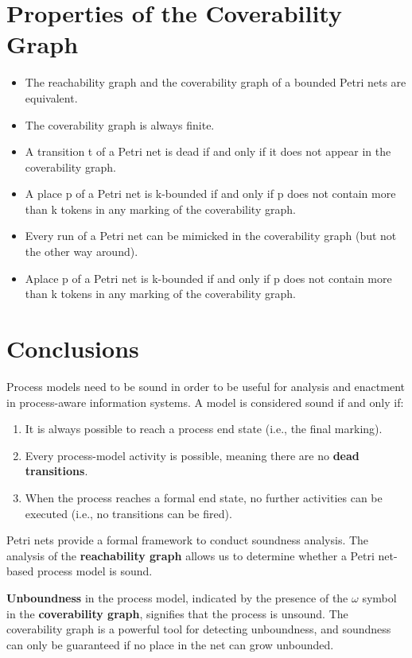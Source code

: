     
    
    \section{Properties of the Coverability Graph}
    \begin{itemize}
        \item The reachability graph and the coverability graph of a bounded Petri nets are equivalent.
        \item The coverability graph is always finite.
        \item A transition t of a Petri net is dead if and only if it does not appear in the coverability graph.
        \item A place p of a Petri net is k-bounded if and only if p does not contain more than k tokens in any marking of the coverability graph.
        \item Every run of a Petri net can be mimicked in the coverability graph (but not the other way around).
        \item Aplace p of a Petri net is k-bounded if and only if p does not contain more than k tokens in any marking of the coverability graph.
    \end{itemize}
    
    \section{Conclusions}
    
    Process models need to be sound in order to be useful for analysis and enactment in process-aware information systems. A model is considered sound if and only if:
    
    \begin{enumerate}
        \item It is always possible to reach a process end state (i.e., the final marking).
        \item Every process-model activity is possible, meaning there are no \textbf{dead transitions}.
        \item When the process reaches a formal end state, no further activities can be executed (i.e., no transitions can be fired).
    \end{enumerate}
    
    \newline
    \newline
    
    Petri nets provide a formal framework to conduct soundness analysis. The analysis of the \textbf{reachability graph} allows us to determine whether a Petri net-based process model is sound.
    
    \textbf{Unboundness} in the process model, indicated by the presence of the $\omega$ symbol in the \textbf{coverability graph}, signifies that the process is unsound. The coverability graph is a powerful tool for detecting unboundness, and soundness can only be guaranteed if no place in the net can grow unbounded.
    